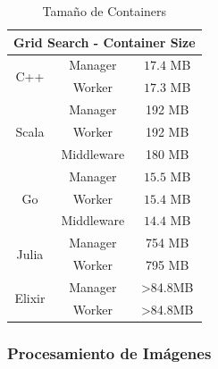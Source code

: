 \documentclass[11pt]{article}
\let\Oldsubsubsection\subsubsection
\renewcommand{\subsubsection}{\FloatBarrier\Oldsubsubsection}
\begin{document}
\begin{table}[H]
\centering
\begin{tabular}{|ccc|}
\hline
\multicolumn{3}{|c|}{Grid Search - Container Size} \\ \hline
\multicolumn{1}{|c|}{\multirow{2}{*}{C++}} & \multicolumn{1}{c|}{Manager} & $17.4$ MB \\ \cline{2-3} 
\multicolumn{1}{|c|}{} & \multicolumn{1}{c|}{Worker} & $17.3$ MB \\ \hline
\multicolumn{1}{|c|}{\multirow{3}{*}{Scala}} & \multicolumn{1}{c|}{Manager} & 192 MB \\ \cline{2-3} 
\multicolumn{1}{|c|}{} & \multicolumn{1}{c|}{Worker} & 192 MB \\ \cline{2-3} 
\multicolumn{1}{|c|}{} & \multicolumn{1}{c|}{Middleware} & 180 MB \\ \hline
\multicolumn{1}{|c|}{\multirow{3}{*}{Go}} & \multicolumn{1}{c|}{Manager} & $15.5$ MB \\ \cline{2-3} 
\multicolumn{1}{|c|}{} & \multicolumn{1}{c|}{Worker} & $15.4$ MB \\ \cline{2-3} 
\multicolumn{1}{|c|}{} & \multicolumn{1}{c|}{Middleware} & $14.4$ MB \\ \hline
\multicolumn{1}{|c|}{\multirow{2}{*}{Julia}} & \multicolumn{1}{c|}{Manager} & 754 MB \\ \cline{2-3} 
\multicolumn{1}{|c|}{} & \multicolumn{1}{c|}{Worker} & 795 MB \\ \hline
\multicolumn{1}{|c|}{\multirow{2}{*}{Elixir}} & \multicolumn{1}{c|}{Manager} & \textgreater{}84.8MB \\ \cline{2-3} 
\multicolumn{1}{|c|}{} & \multicolumn{1}{c|}{Worker} & \textgreater{}84.8MB \\ \hline
\end{tabular}
\caption{Tamaño de Containers}
\end{table}

\subsubsection{Procesamiento de Imágenes}
\end{document}

